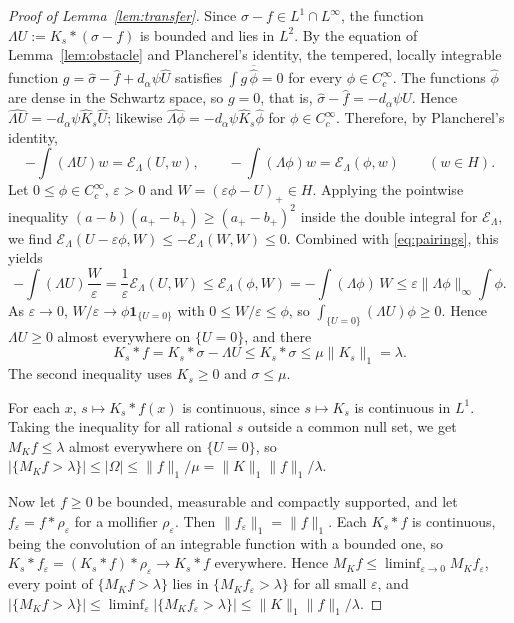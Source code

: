 \documentclass[11pt]{amsart}
\theoremstyle{definition}
\theoremstyle{remark}
\numberwithin{equation}{section}
\newcommand{\Cc}{C_c^\infty}
\begin{document}
\begin{proof}[Proof of Lemma~\ref{lem:transfer}]
Since $\sigma-f\in L^1\cap L^\infty$, the function $\Lambda U:=K_s*(\sigma-f)$ is bounded and lies in $L^2$. By the equation of Lemma~\ref{lem:obstacle} and Plancherel's identity, the tempered, locally integrable function $g=\hat\sigma-\hat f+d_\alpha\psi\hat U$ satisfies $\int g\,\overline{\hat\phi}=0$ for every $\phi\in\Cc$. The functions $\hat\phi$ are dense in the Schwartz space, so $g=0$, that is, $\hat\sigma-\hat f=-d_\alpha\psi\hat U$. Hence $\widehat{\Lambda U}=-d_\alpha\psi\hat K_s\hat U$; likewise $\widehat{\Lambda\phi}=-d_\alpha\psi\hat K_s\hat\phi$ for $\phi\in\Cc$. Therefore, by Plancherel's identity,
\begin{equation}\label{eq:pairings}
-\int(\Lambda U)w=\mathcal E_\Lambda(U,w),\qquad-\int(\Lambda\phi)w=\mathcal E_\Lambda(\phi,w)\qquad(w\in H).
\end{equation}
Let $0\le\phi\in\Cc$, $\varepsilon>0$ and $W=(\varepsilon\phi-U)_+\in H$. Applying the pointwise inequality $(a-b)(a_+-b_+)\ge(a_+-b_+)^2$ inside the double integral for $\mathcal E_\Lambda$, we find $\mathcal E_\Lambda(U-\varepsilon\phi,W)\le-\mathcal E_\Lambda(W,W)\le0$. Combined with \eqref{eq:pairings}, this yields
\[
-\int(\Lambda U)\frac W\varepsilon=\frac1\varepsilon\mathcal E_\Lambda(U,W)\le\mathcal E_\Lambda(\phi,W)=-\int(\Lambda\phi)\,W\le\varepsilon\|\Lambda\phi\|_\infty\int\phi .
\]
As $\varepsilon\to0$, $W/\varepsilon\to\phi\mathbf 1_{\{U=0\}}$ with $0\le W/\varepsilon\le\phi$, so $\int_{\{U=0\}}(\Lambda U)\phi\ge0$. Hence $\Lambda U\ge0$ almost everywhere on $\{U=0\}$, and there
\[
K_s*f=K_s*\sigma-\Lambda U\le K_s*\sigma\le\mu\|K_s\|_1=\lambda .
\]
The second inequality uses $K_s\ge0$ and $\sigma\le\mu$.

For each $x$, $s\mapsto K_s*f(x)$ is continuous, since $s\mapsto K_s$ is continuous in $L^1$. Taking the inequality for all rational $s$ outside a common null set, we get $M_Kf\le\lambda$ almost everywhere on $\{U=0\}$, so $|\{M_Kf>\lambda\}|\le|\Omega|\le\|f\|_1/\mu=\|K\|_1\|f\|_1/\lambda$.

Now let $f\ge0$ be bounded, measurable and compactly supported, and let $f_\varepsilon=f*\rho_\varepsilon$ for a mollifier $\rho_\varepsilon$. Then $\|f_\varepsilon\|_1=\|f\|_1$. Each $K_s*f$ is continuous, being the convolution of an integrable function with a bounded one, so $K_s*f_\varepsilon=(K_s*f)*\rho_\varepsilon\to K_s*f$ everywhere. Hence $M_Kf\le\liminf_{\varepsilon\to0}M_Kf_\varepsilon$, every point of $\{M_Kf>\lambda\}$ lies in $\{M_Kf_\varepsilon>\lambda\}$ for all small $\varepsilon$, and $|\{M_Kf>\lambda\}|\le\liminf_\varepsilon|\{M_Kf_\varepsilon>\lambda\}|\le\|K\|_1\|f\|_1/\lambda$.
\end{proof}
\end{document}
